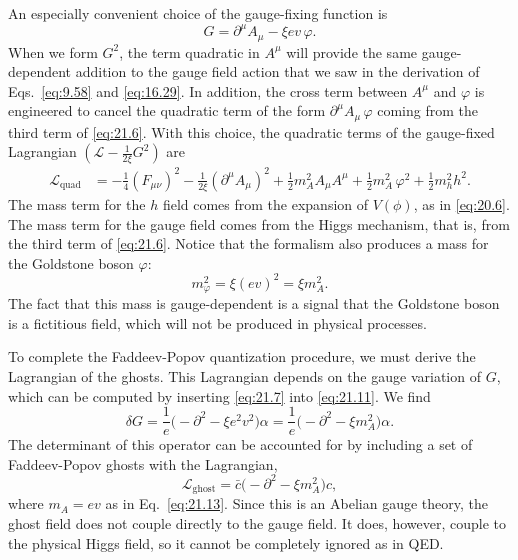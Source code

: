 An especially convenient choice of the gauge-fixing function is
\begin{equation}
  G = \partial^\mu A_\mu - \xi e v\,\varphi .
  \label{eq:21.11}
\end{equation}
When we form $G^2$, the term quadratic in $A^\mu$ will provide the same
gauge-dependent addition to the gauge field action that we saw in the
derivation of Eqs.~\eqref{eq:9.58} and \eqref{eq:16.29}.  In addition, the
cross term between $A^\mu$ and $\varphi$ is engineered to cancel the quadratic
term of the form $\partial^\mu A_\mu\,\varphi$ coming from the third term of
\eqref{eq:21.6}.  With this choice, the quadratic terms of the gauge-fixed
Lagrangian $(\mathcal{L} - \frac{1}{2\xi}G^2)$ are
\begin{equation}
  \begin{aligned}
    \mathcal{L}_{\mathrm{quad}} &= -\frac{1}{4}(F_{\mu\nu})^2
      - \frac{1}{2\xi}(\partial^\mu A_\mu)^2
      + \frac{1}{2}m_A^2 A_\mu A^\mu + \frac{1}{2}m_A^2\,\varphi^2
      + \frac{1}{2}m_h^2 h^2 .
  \end{aligned}
  \label{eq:21.12}
\end{equation}
The mass term for the $h$ field comes from the expansion of $V(\phi)$, as in
\eqref{eq:20.6}.  The mass term for the gauge field comes from the Higgs
mechanism, that is, from the third term of \eqref{eq:21.6}.  Notice that the
formalism also produces a mass for the Goldstone boson $\varphi$:
\begin{equation}
  m_\varphi^2 = \xi(e v)^2 = \xi m_A^2 .
  \label{eq:21.13}
\end{equation}
The fact that this mass is gauge-dependent is a signal that the Goldstone
boson is a fictitious field, which will not be produced in physical
processes.

To complete the Faddeev-Popov quantization procedure, we must derive the
Lagrangian of the ghosts.  This Lagrangian depends on the gauge variation of
$G$, which can be computed by inserting \eqref{eq:21.7} into \eqref{eq:21.11}.
We find
\begin{equation}
  \delta G = \frac{1}{e}\bigl( -\partial^2 - \xi e^2v^2 \bigr)\alpha
  = \frac{1}{e}\bigl( -\partial^2 - \xi m_A^2 \bigr)\alpha .
  \label{eq:21.14}
\end{equation}
The determinant of this operator can be accounted for by including a set of
Faddeev-Popov ghosts with the Lagrangian,
\begin{equation}
  \mathcal{L}_{\mathrm{ghost}} = \bar{c}\bigl( -\partial^2 - \xi m_A^2 \bigr)c ,
  \label{eq:21.15}
\end{equation}
where $m_A = ev$ as in Eq.~\eqref{eq:21.13}.  Since this is an Abelian gauge
theory, the ghost field does not couple directly to the gauge field.  It
does, however, couple to the physical Higgs field, so it cannot be completely
ignored as in QED.


